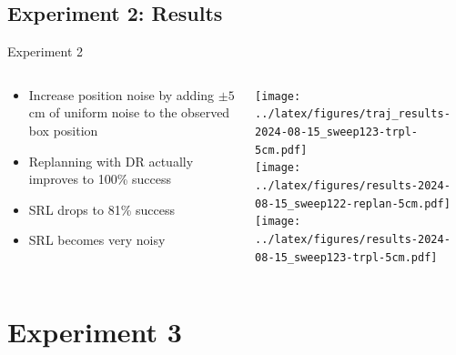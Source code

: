\documentclass[16:9,en,navbarinfooter]{sdqbeamer}
\begin{document}
\subsection{Experiment 2: Results}
\begin{frame}{Experiment 2}

	\begin{columns}[t]
		\begin{column}{0.3\textwidth}
			\vspace{.1cm}
			\begin{itemize}
				\item Increase position noise by adding $\pm 5$cm of uniform noise to the observed box position
				\item Replanning with DR actually improves to 100\% success
				\item SRL drops to 81\% success
				\item SRL becomes very noisy
			\end{itemize}
		\end{column}
		\begin{column}{0.6\textwidth}
			\vspace{1cm}
			\texttt{[image: ../latex/figures/traj\_results-2024-08-15\_sweep123-trpl-5cm.pdf]}\\
			\vspace{-1cm}
			\texttt{[image: ../latex/figures/results-2024-08-15\_sweep122-replan-5cm.pdf]}\\
			\texttt{[image: ../latex/figures/results-2024-08-15\_sweep123-trpl-5cm.pdf]}\\
		\end{column}
	\end{columns}
\end{frame}

\section{Experiment 3}
\end{document}
